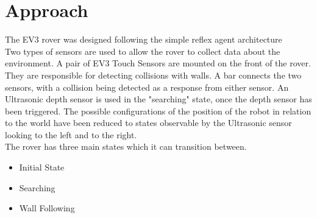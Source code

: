 \documentclass[a4paper,12pt,twocolumn]{article}
\begin{document}

\section{Approach}
The EV3 rover was designed following the simple reflex agent architecture  \cite{brooks1991intelligence}\\


Two types of sensors are used to allow the rover to collect data about the environment. A pair of EV3 Touch Sensors are mounted on the front of the rover. They are responsible for detecting collisions with walls. A bar connects the two sensors, with a collision being detected as a response from either sensor. An Ultrasonic depth sensor is used in the "searching" state, once the depth sensor has been triggered. The possible configurations of the position of the robot in relation to the world have been reduced to states observable by the Ultrasonic sensor looking to the left and to the right.\\

The rover has three main states which it can transition between.
\begin{itemize}
    \item Initial State
    \item Searching
    \item Wall Following
\end{itemize}
\end{document}
